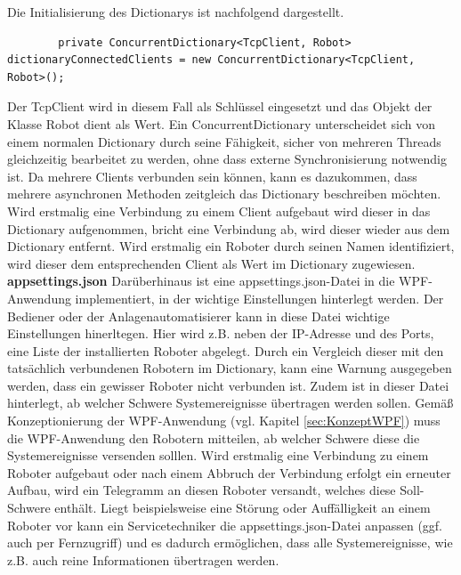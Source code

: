 \documentclass[ a4paper,
                oneside,
                toc=bibliography,
                toc=listof
                ]{scrbook}
\begin{document}
    Die Initialisierung des Dictionarys ist nachfolgend dargestellt.
    \begin{lstlisting}
    	private ConcurrentDictionary<TcpClient, Robot> dictionaryConnectedClients = new ConcurrentDictionary<TcpClient, Robot>();
    \end{lstlisting}
    Der TcpClient wird in diesem Fall als Schlüssel eingesetzt und das Objekt der Klasse Robot dient als Wert. Ein ConcurrentDictionary unterscheidet sich von einem normalen Dictionary durch seine Fähigkeit, sicher von mehreren Threads gleichzeitig bearbeitet zu werden, ohne dass externe Synchronisierung notwendig ist. Da mehrere Clients verbunden sein können, kann es dazukommen, dass mehrere asynchronen Methoden zeitgleich das Dictionary beschreiben möchten.
   	Wird erstmalig eine Verbindung zu einem Client aufgebaut wird dieser in das Dictionary aufgenommen, bricht eine Verbindung ab, wird dieser wieder aus dem Dictionary entfernt. Wird erstmalig ein Roboter durch seinen Namen identifiziert, wird dieser dem entsprechenden Client als Wert im Dictionary zugewiesen.\\
   	\textbf{appsettings.json}
   	Darüberhinaus ist eine appsettings.json-Datei in die WPF-Anwendung implementiert, in der wichtige Einstellungen hinterlegt werden. Der Bediener oder der Anlagenautomatisierer kann in diese Datei wichtige Einstellungen hinerltegen. Hier wird z.B. neben der IP-Adresse und des Ports, eine Liste der installierten Roboter abgelegt. Durch ein Vergleich dieser mit den tatsächlich verbundenen Robotern im Dictionary, kann eine Warnung ausgegeben werden, dass ein gewisser Roboter nicht verbunden ist. Zudem ist in dieser Datei hinterlegt, ab welcher Schwere Systemereignisse übertragen werden sollen. Gemäß Konzeptionierung der WPF-Anwendung (vgl. Kapitel \ref{sec:KonzeptWPF}) muss die WPF-Anwendung den Robotern mitteilen, ab welcher Schwere diese die Systemereignisse versenden solllen. Wird erstmalig eine Verbindung zu einem Roboter aufgebaut oder nach einem Abbruch der Verbindung erfolgt ein erneuter Aufbau, wird ein Telegramm an diesen Roboter versandt, welches diese Soll-Schwere enthält. Liegt beispielsweise eine Störung oder Auffälligkeit an einem Roboter vor kann ein Servicetechniker die appsettings.json-Datei anpassen (ggf. auch per Fernzugriff) und es dadurch ermöglichen, dass alle Systemereignisse, wie z.B. auch reine Informationen übertragen werden.
\end{document}
